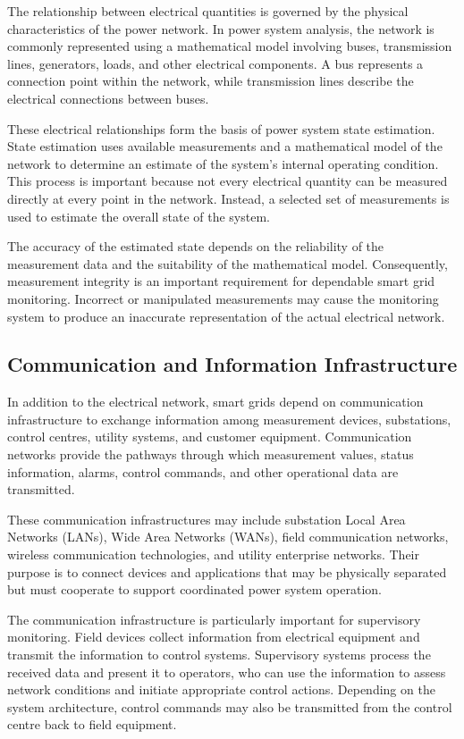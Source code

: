 \documentclass[12pt,a4paper]{report}
\begin{document}
The relationship between electrical quantities is governed by the physical characteristics of
the power network. In power system analysis, the network is commonly represented using a mathematical
model involving buses, transmission lines, generators, loads, and other electrical components. A
bus represents a connection point within the network, while transmission lines describe the
electrical connections between buses.

These electrical relationships form the basis of power system state estimation. State estimation
uses available measurements and a mathematical model of the network to determine an estimate of
the system's internal operating condition. This process is important because not every electrical
quantity can be measured directly at every point in the network. Instead, a selected set of
measurements is used to estimate the overall state of the system.

The accuracy of the estimated state depends on the reliability of the measurement data and the
suitability of the mathematical model. Consequently, measurement integrity is an important
requirement for dependable smart grid monitoring. Incorrect or manipulated measurements may
cause the monitoring system to produce an inaccurate representation of the actual electrical network.

\subsection{Communication and Information Infrastructure}
In addition to the electrical network, smart grids depend on communication infrastructure to
exchange information among measurement devices, substations, control centres, utility systems,
and customer equipment. Communication networks provide the pathways through which measurement
values, status information, alarms, control commands, and other operational data are transmitted.

These communication infrastructures may include substation Local Area Networks (LANs), Wide
Area Networks (WANs), field communication networks, wireless communication technologies, and
utility enterprise networks. Their purpose is to connect devices and applications that may be
physically separated but must cooperate to support coordinated power system operation.

The communication infrastructure is particularly important for supervisory monitoring. Field
devices collect information from electrical equipment and transmit the information to control
systems. Supervisory systems process the received data and present it to operators, who can
use the information to assess network conditions and initiate appropriate control actions.
Depending on the system architecture, control commands may also be transmitted from the control
centre back to field equipment.
\end{document}
